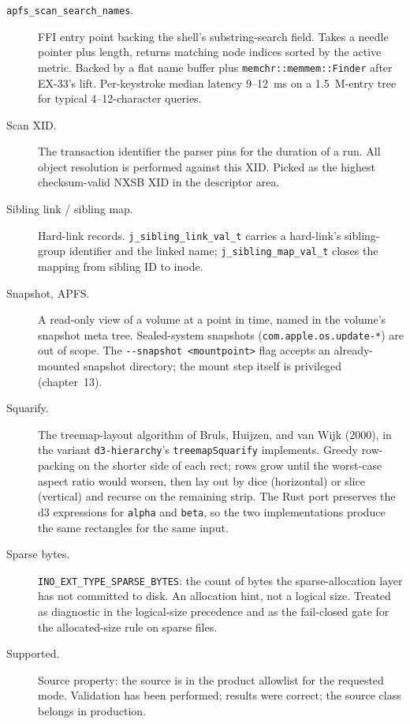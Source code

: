 \begin{description}
  \item[\texttt{apfs\_scan\_search\_names}.] FFI entry point
    backing the shell's substring-search field. Takes a needle
    pointer plus length, returns matching node indices sorted by
    the active metric. Backed by a flat name buffer plus
    \texttt{memchr::memmem::Finder} after EX-33's lift.
    Per-keystroke median latency 9--12~ms on a 1.5~M-entry tree
    for typical 4--12-character queries.
  \item[Scan XID.] The transaction identifier the parser pins for
    the duration of a run. All object resolution is performed
    against this XID. Picked as the highest checksum-valid NXSB
    XID in the descriptor area.
  \item[Sibling link / sibling map.] Hard-link records.
    \texttt{j\_sibling\_link\_val\_t} carries a hard-link's
    sibling-group identifier and the linked name;
    \texttt{j\_sibling\_map\_val\_t} closes the mapping from
    sibling ID to inode.
  \item[Snapshot, APFS.] A read-only view of a volume at a
    point in time, named in the volume's snapshot meta tree.
    Sealed-system snapshots (\texttt{com.apple.os.update-*}) are
    out of scope. The \texttt{-{}-snapshot <mountpoint>} flag
    accepts an already-mounted snapshot directory; the mount step
    itself is privileged (chapter~13).
  \item[Squarify.] The treemap-layout algorithm of Bruls,
    Huijzen, and van Wijk (2000), in the variant
    \texttt{d3-hierarchy}'s \texttt{treemapSquarify} implements.
    Greedy row-packing on the shorter side of each rect; rows
    grow until the worst-case aspect ratio would worsen, then
    lay out by dice (horizontal) or slice (vertical) and recurse
    on the remaining strip. The Rust port preserves the d3
    expressions for \texttt{alpha} and \texttt{beta}, so the
    two implementations produce the same rectangles for the
    same input.
  \item[Sparse bytes.] \texttt{INO\_EXT\_TYPE\_SPARSE\_BYTES}:
    the count of bytes the sparse-allocation layer has not
    committed to disk. An allocation hint, not a logical size.
    Treated as diagnostic in the logical-size precedence and as
    the fail-closed gate for the allocated-size rule on sparse
    files.
  \item[Supported.] Source property: the source is in the product
    allowlist for the requested mode. Validation has been
    performed; results were correct; the source class belongs in
    production.

\end{description}
